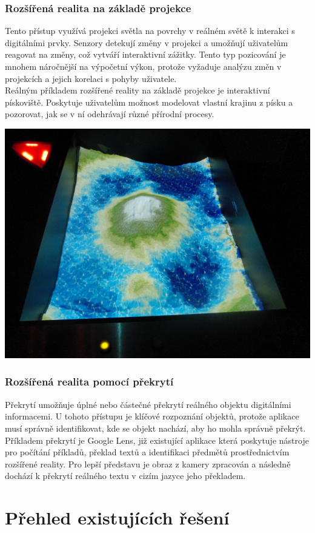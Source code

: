 \subsubsection{Rozšířená realita na základě projekce}
Tento přístup využívá projekci světla na povrchy v reálném světě k interakci s digitálními prvky. Senzory detekují změny v projekci a umožňují uživatelům reagovat na změny, což vytváří interaktivní zážitky. Tento typ pozicování je mnohem náročnější na výpočetní výkon, protože vyžaduje analýzu změn v projekcích a jejich korelaci s pohyby uživatele. \cite{AROverview} \\
Reálným příkladem rozšířené reality na základě projekce je interaktivní pískoviště. Poskytuje uživatelům možnost modelovat vlastní krajinu z písku a pozorovat, jak se v ní odehrávají různé přírodní procesy. \cite{IQLANDIAGeo} \\
\begin{center}
    \includegraphics[scale=0.13]{images/IQLANDIA}
\end{center}
\subsubsection{Rozšířená realita pomocí překrytí}
Překrytí umožňuje úplné nebo částečné překrytí reálného objektu digitálními informacemi. U tohoto přístupu je klíčové rozpoznání objektů, protože aplikace musí správně identifikovat, kde se objekt nachází, aby ho mohla správně překrýt. \cite{AROverview} \\
Příkladem překrytí je Google Lens, již existující aplikace která poskytuje nástroje pro počítání příkladů, překlad textů a identifikaci předmětů prostřednictvím rozšířené reality. Pro lepší představu je obraz z kamery zpracován a následně dochází k překrytí reálného textu v cizím jazyce jeho překladem. \cite{googlelens}
\section{Přehled existujících řešení}